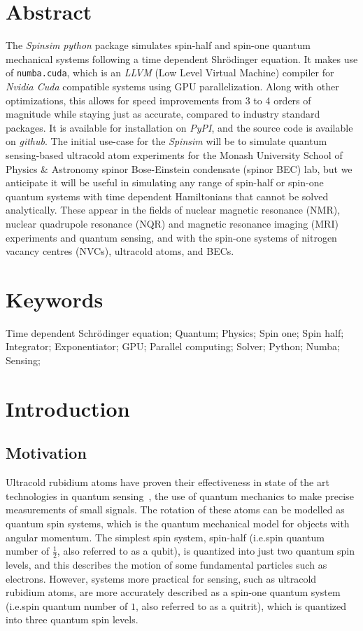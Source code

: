 \documentclass{jors}
\begin{document}
\section{Abstract}
	The \emph{Spinsim} \emph{python} package simulates spin-half and spin-one quantum mechanical systems following a time dependent Shr\"odinger equation.
	It makes use of \texttt{numba.cuda}, which is an \emph{LLVM} (Low Level Virtual Machine) compiler for \emph{Nvidia Cuda} compatible systems using GPU parallelization. 
	Along with other optimizations, this allows for speed improvements from 3 to 4 orders of magnitude while staying just as accurate, compared to industry standard packages. %
	It is available for installation on \emph{PyPI}, and the source code is available on \emph{github}.
	The initial use-case for the \emph{Spinsim} will be to simulate quantum sensing-based ultracold atom experiments for the Monash University School of Physics \& Astronomy spinor Bose-Einstein condensate (spinor BEC) lab, but we anticipate it will be useful in simulating any range of spin-half or spin-one quantum systems with time dependent Hamiltonians that cannot be solved analytically.
	These appear in the fields of nuclear magnetic resonance (NMR), nuclear quadrupole resonance (NQR) and magnetic resonance imaging (MRI) experiments and quantum sensing, and with the spin-one systems of nitrogen vacancy centres (NVCs), ultracold atoms, and BECs.

\section{Keywords}
Time dependent Schr\"odinger equation; Quantum; Physics; Spin one; Spin half; Integrator; Exponentiator; GPU; Parallel computing; Solver; Python; Numba; Sensing;

\section{Introduction}
\subsection{Motivation}
	Ultracold rubidium atoms have proven their effectiveness in state of the art technologies in quantum sensing~\cite{degen_quantum_2017}, the use of quantum mechanics to make precise measurements of small signals.
	The rotation of these atoms can be modelled as quantum spin systems, which is the quantum mechanical model for objects with angular momentum.
	The simplest spin system, spin-half (i.e.spin quantum number of $ \frac12 $, also referred to as a qubit), is quantized into just two quantum spin levels, and this describes the motion of some fundamental particles such as electrons.
	However, systems more practical for sensing, such as ultracold rubidium atoms, are more accurately described as a spin-one quantum system (i.e.spin quantum number of $ 1 $, also referred to as a quitrit), which is quantized into three quantum spin levels.
	
\end{document}
